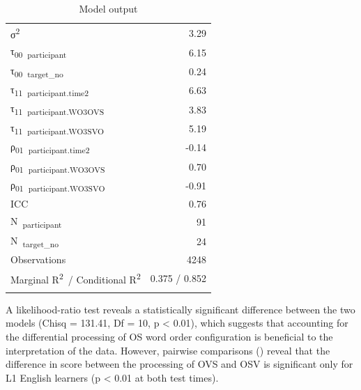 \begin{table}
\begin{tabularx}{\textwidth}{lrrr}
    σ\textsuperscript{2} & \multicolumn{3}{X}{3.29}\\
    τ\textsubscript{00}~\textsubscript{participant} & \multicolumn{3}{X}{6.15}\\
    τ\textsubscript{00}~\textsubscript{target\_no} & \multicolumn{3}{X}{0.24}\\
    τ\textsubscript{11}~\textsubscript{participant.time2} & \multicolumn{3}{X}{6.63}\\
    τ\textsubscript{11}~\textsubscript{participant.WO3OVS} & \multicolumn{3}{X}{3.83}\\
    τ\textsubscript{11}~\textsubscript{participant.WO3SVO} & \multicolumn{3}{X}{5.19}\\
    ρ\textsubscript{01}~\textsubscript{participant.time2} & \multicolumn{3}{X}{{}-0.14}\\
    ρ\textsubscript{01}~\textsubscript{participant.WO3OVS} & \multicolumn{3}{X}{0.70}\\
    ρ\textsubscript{01}~\textsubscript{participant.WO3SVO} & \multicolumn{3}{X}{{}-0.91}\\
    ICC & \multicolumn{3}{X}{0.76}\\
    N~\textsubscript{participant} & \multicolumn{3}{X}{91}\\
    N~\textsubscript{target\_no} & \multicolumn{3}{X}{24}\\
    Observations & \multicolumn{3}{X}{4248}\\
    Marginal R\textsuperscript{2}~/ Conditional R\textsuperscript{2} & \multicolumn{3}{X}{0.375 / 0.852}\\
    \lspbottomrule
    \end{tabularx}
    \caption{Model output}
    \label{tab:05:9}
\end{table}

A likelihood-ratio test reveals a statistically significant difference between the two models (Chisq = 131.41, Df = 10, p < 0.01), which suggests that accounting for the differential processing of OS word order configuration is beneficial to the interpretation of the data. However, pairwise comparisons () reveal that the difference in score between the processing of OVS and OSV is significant only for L1 English learners (p < 0.01 at both test times).

